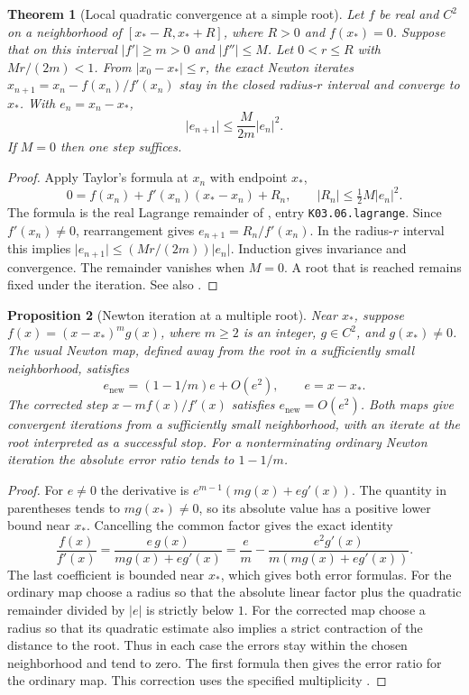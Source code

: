 \documentclass[11pt,oneside,openany]{book}
\theoremstyle{plain}
\newtheorem{theorem}{Theorem}[chapter]
\newtheorem{proposition}[theorem]{Proposition}
\theoremstyle{definition}
\theoremstyle{remark}
\begin{document}
\begin{theorem}[Local quadratic convergence at a simple root]\label{p206:W73}
Let \(f\) be real and \(C^2\) on a neighborhood of
\([x_*-R,x_*+R]\), where \(R>0\) and \(f(x_*)=0\). Suppose that on this
interval \(\lvert f'\rvert\ge m>0\) and \(\lvert f''\rvert\le M\).
Let \(0<r\le R\) with \(Mr/(2m)<1\). From
\(\lvert x_0-x_*\rvert\le r\), the exact Newton iterates
\(x_{n+1}=x_n-f(x_n)/f'(x_n)\) stay in the closed radius-\(r\) interval
and converge to \(x_*\). With \(e_n=x_n-x_*\),
\[
 \lvert e_{n+1}\rvert\le\frac{M}{2m}\lvert e_n\rvert^2 .
\]
If \(M=0\) then one step suffices.
\end{theorem}
\begin{proof}
Apply Taylor's formula at \(x_n\) with endpoint \(x_*\),
\[
 0=f(x_n)+f'(x_n)(x_*-x_n)+R_n,\qquad
 \lvert R_n\rvert\le\tfrac12 M\lvert e_n\rvert^2 .
\]
The formula is the real Lagrange remainder of \cite{d03},
entry \texttt{K03.06.lagrange}. Since \(f'(x_n)\ne0\),
rearrangement gives \(e_{n+1}=R_n/f'(x_n)\). In the radius-\(r\)
interval this implies
\(\lvert e_{n+1}\rvert\le (Mr/(2m))\lvert e_n\rvert\).
Induction gives invariance and convergence. The remainder vanishes
when \(M=0\). A root that is reached remains fixed under the iteration.
See also \cite[Section~2.3]{persson}.
\end{proof}

\begin{proposition}[Newton iteration at a multiple root]\label{p206:W74}
Near \(x_*\), suppose
\(f(x)=(x-x_*)^m g(x)\), where \(m\ge2\) is an integer,
\(g\in C^2\), and \(g(x_*)\ne0\). The usual Newton map, defined
away from the root in a sufficiently small neighborhood, satisfies
\[
 e_{\mathrm{new}}=(1-1/m)e+O(e^2),\qquad e=x-x_*.
\]
The corrected step \(x-mf(x)/f'(x)\) satisfies
\(e_{\mathrm{new}}=O(e^2)\). Both maps give convergent iterations
from a sufficiently small neighborhood, with an iterate at the
root interpreted as a successful stop. For a nonterminating
ordinary Newton iteration the absolute error ratio tends to
\(1-1/m\).
\end{proposition}
\begin{proof}
For \(e\ne0\) the derivative is
\(e^{m-1}(m g(x)+e g'(x))\). The quantity in parentheses tends to
\(m g(x_*)\ne0\), so its absolute value has a positive lower
bound near \(x_*\). Cancelling the common factor gives the exact
identity
\[
 \frac{f(x)}{f'(x)}
 =\frac{e\,g(x)}{m g(x)+e g'(x)}
 =\frac{e}{m}-\frac{e^2 g'(x)}{m(m g(x)+e g'(x))}.
\]
The last coefficient is bounded near \(x_*\), which gives both
error formulas. For the ordinary map choose a radius so that the
absolute linear factor plus the quadratic remainder divided by
\(\lvert e\rvert\) is strictly below \(1\). For the corrected map
choose a radius so that its quadratic estimate also implies a
strict contraction of the distance to the root. Thus in each case
the errors stay within the chosen neighborhood and tend to zero.
The first formula then gives the error ratio for the ordinary map.
This correction uses the specified multiplicity
\cite[Section~2.4]{persson}.
\end{proof}
\end{document}
